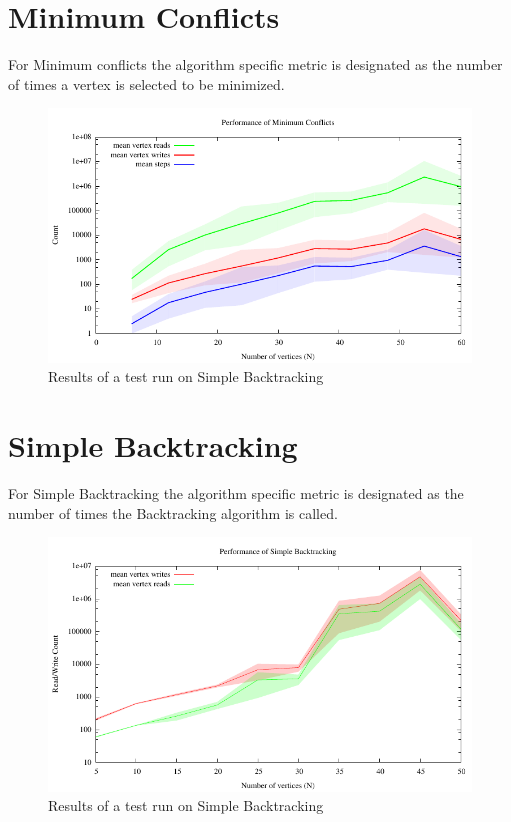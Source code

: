 \documentclass{article}
\begin{document}
\begin{multicols}{2}
\section{Minimum Conflicts}
For Minimum conflicts the algorithm specific metric is designated as the number of times a vertex is selected to be minimized.
\begin{figure}[H]
	\centering
	\includegraphics[width=\linewidth]{../results/min_conflicts/min_conflicts_performance}
	\caption{Results of a test run on Simple Backtracking }
\end{figure}

\section{Simple Backtracking}
For Simple Backtracking the algorithm specific metric is designated as the number of times the Backtracking algorithm is called.
\begin{figure}[H]
	\centering
	\includegraphics[width=\linewidth]{../results/backtracking_simple/bt_simple_performance}
	\caption{Results of a test run on Simple Backtracking }
\end{figure}



\end{multicols}
\end{document}
